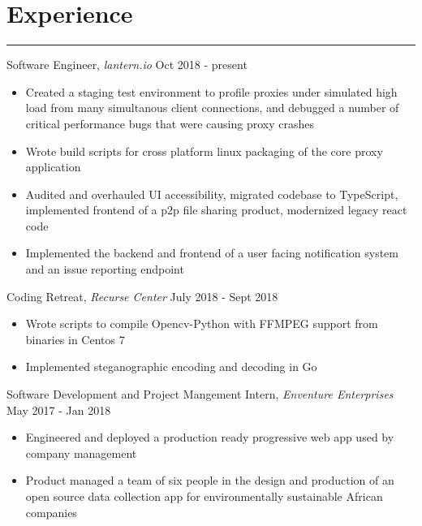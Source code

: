 \documentclass[12pt]{article}
\begin{document}
\section*{Experience}
\vspace{-0.25cm}
\hrule
\vspace{0.25cm}

\noindent Software Engineer, \textit{lantern.io} \hfill Oct 2018 - present
\vspace{-0.2cm}
\begin{itemize}
  \itemsep-0.4em
\item Created a staging test environment to profile proxies under simulated high load from many simultanous client connections, and debugged a number of critical performance bugs that were causing proxy crashes
\item Wrote build scripts for cross platform linux packaging of the core proxy application
\item Audited and overhauled UI accessibility, migrated codebase to TypeScript, implemented frontend of a p2p file sharing product, modernized legacy react code
\item Implemented the backend and frontend of a user facing notification system and an issue reporting endpoint
\end{itemize}


\noindent Coding Retreat, \textit{Recurse Center} \hfill July 2018 - Sept 2018
\vspace{-0.2cm}
\begin{itemize}
  \itemsep-0.4em
	\item Wrote scripts to compile Opencv-Python with FFMPEG support from binaries in Centos 7
        \item Implemented steganographic encoding and decoding in Go
\end{itemize}

\noindent Software Development and Project Mangement Intern, \textit{Enventure Enterprises} \hfill May 2017 - Jan 2018
\vspace{-0.2cm}
\begin{itemize}
  \itemsep-0.4em
	\item Engineered and deployed a production ready progressive web app used by company management
	\item Product managed a team of six people in the design and production of an open source data collection app for environmentally sustainable African companies
\end{itemize}
\end{document}
